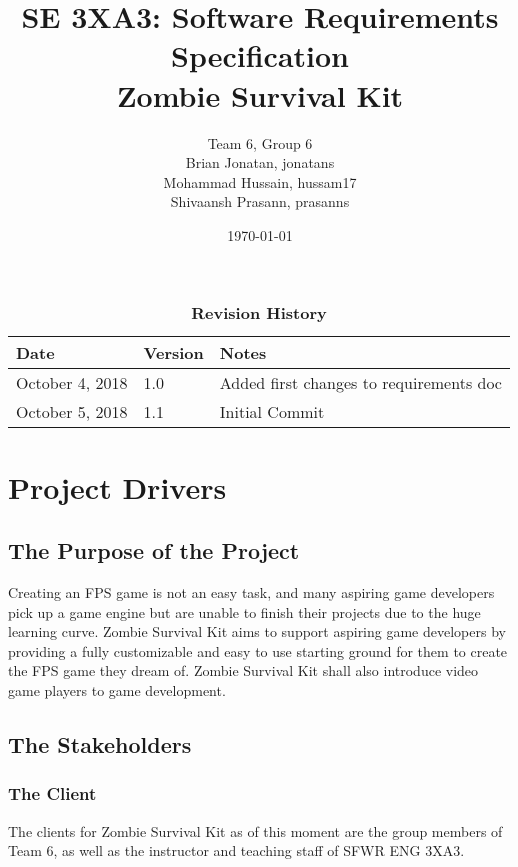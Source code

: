 \documentclass[12pt, titlepage]{article}
\title{SE 3XA3: Software Requirements Specification\\Zombie Survival Kit}
\author{Team 6, Group 6
		\\ Brian Jonatan, jonatans
		\\ Mohammad Hussain, hussam17
		\\ Shivaansh Prasann, prasanns
}
\date{\today}
\begin{document}
\maketitle

\tableofcontents
\listoftables
\listoffigures

\begin{table}[bp]
\caption{\bf Revision History}
\begin{tabularx}{\textwidth}{p{3cm}p{2cm}X}
\toprule {\bf Date} & {\bf Version} & {\bf Notes}\\
\midrule
October 4, 2018 & 1.0 & Added first changes to requirements doc\\
October 5, 2018 & 1.1 & Initial Commit\\
\bottomrule
\end{tabularx}
\end{table}

\newpage



\section{Project Drivers}

\subsection{The Purpose of the Project}
Creating an FPS game is not an easy task, and many aspiring game developers pick up a game engine but are unable to finish their projects due to the huge learning curve. 
\newline
\newline
Zombie Survival Kit aims to support aspiring game developers by providing a fully customizable and easy to use starting ground for them to create the FPS game they dream of. Zombie Survival Kit shall also introduce video game players to game development.
\subsection{The Stakeholders}

\subsubsection{The Client}
The clients for Zombie Survival Kit as of this moment are the group members of Team 6, as well as the instructor and teaching staff of SFWR ENG 3XA3.
\end{document}
